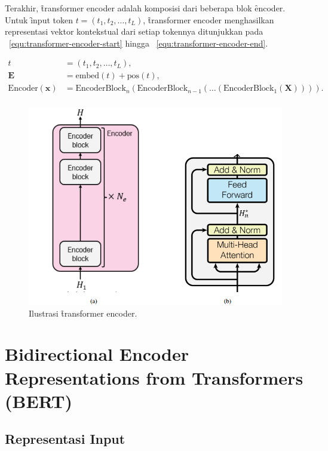 	Terakhir, \f{transformer encoder} adalah komposisi dari beberapa blok \f{encoder}. Untuk \f{input} token $t=(t_1, t_2, \dots, t_L)$, \f{transformer encoder} menghasilkan representasi vektor kontekstual dari setiap tokennya ditunjukkan pada \equ~\ref{equ:transformer-encoder-start} hingga \equ~\ref{equ:transformer-encoder-end}.

	\begin{align}
		\label{equ:transformer-encoder-start} 
		t &= (t_1, t_2, \dots, t_L), \\
		\mathbf{E} &= \text{embed}(t)+ \text{pos}(t), \\
		\label{equ:transformer-encoder-end}
		\text{Encoder}(\mathbf{x}) &= \text{EncoderBlock}_n(\text{EncoderBlock}_{n-1}(\dots(\text{EncoderBlock}_1(\mathbf{X})))). \\
	\end{align}

	\begin{figure}
		\centering
		\includegraphics[width=1\textwidth]{assets/pics/final-transformers-encoder.png}
		\caption{Ilustrasi \f{transformer encoder}.}
		\label{fig:transformer-encoder}
	\end{figure}

\section{Bidirectional Encoder Representations from Transformers (BERT)}

	\subsection{Representasi Input}
	
